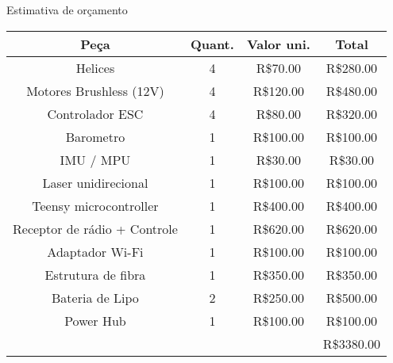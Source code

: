 \begin{frame}[t]{Estimativa de orçamento}
    \transboxout[duration=0.5]
    \centering

    \begin{tabular}{| c | c | c | c}
                  Peça             & Quant. & Valor uni. & Total     \\\hline
                Helices            & 4      & R\$70.00   & R\$280.00 \\
        Motores Brushless (12V)    & 4      & R\$120.00  & R\$480.00 \\
            Controlador ESC        & 4      & R\$80.00   & R\$320.00 \\
               Barometro           & 1      & R\$100.00  & R\$100.00 \\
               IMU / MPU           & 1      & R\$30.00   & R\$30.00  \\
          Laser unidirecional      & 1      & R\$100.00  & R\$100.00 \\
         Teensy microcontroller    & 1      & R\$400.00  & R\$400.00 \\
      Receptor de rádio + Controle & 1      & R\$620.00  & R\$620.00 \\
            Adaptador Wi-Fi        & 1      & R\$100.00  & R\$100.00 \\
           Estrutura de fibra      & 1      & R\$350.00  & R\$350.00 \\
            Bateria de Lipo        & 2      & R\$250.00  & R\$500.00 \\
               Power Hub           & 1      & R\$100.00  & R\$100.00 \\
               \hline
               & & & R\$3380.00    \end{tabular}

\end{frame}
